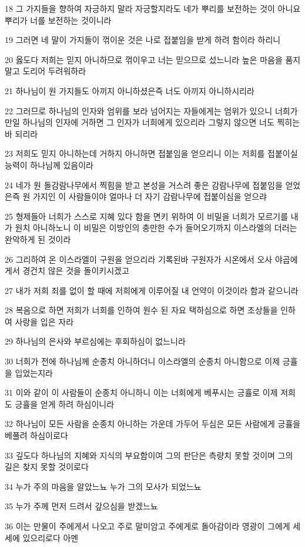 \par 18 그 가지들을 향하여 자긍하지 말라 자긍할지라도 네가 뿌리를 보전하는 것이 아니요 뿌리가 너를 보전하는 것이니라
\par 19 그러면 네 말이 가지들이 꺾이운 것은 나로 접붙임을 받게 하려 함이라 하리니
\par 20 옳도다 저희는 믿지 아니하므로 꺾이우고 너는 믿으므로 섰느니라 높은 마음을 품지 말고 도리어 두려워하라
\par 21 하나님이 원 가지들도 아끼지 아니하셨은즉 너도 아끼지 아니하시리라
\par 22 그러므로 하나님의 인자와 엄위를 보라 넘어지는 자들에게는 엄위가 있으니 너희가 만일 하나님의 인자에 거하면 그 인자가 너희에게 있으리라 그렇지 않으면 너도 찍히는바 되리라
\par 23 저희도 믿지 아니하는데 거하지 아니하면 접붙임을 얻으리니 이는 저희를 접붙이실 능력이 하나님께 있음이라
\par 24 네가 원 돌감람나무에서 찍힘을 받고 본성을 거스려 좋은 감람나무에 접붙임을 얻었은즉 원 가지인 이 사람들이야 얼마나 더 자기 감람나무에 접붙이심을 얻으랴
\par 25 형제들아 너희가 스스로 지혜 있다 함을 면키 위하여 이 비밀을 너희가 모르기를 내가 원치 아니하노니 이 비밀은 이방인의 충만한 수가 들어오기까지 이스라엘의 더러는 완악하게 된 것이라
\par 26 그리하여 온 이스라엘이 구원을 얻으리라 기록된바 구원자가 시온에서 오사 야곱에게서 경건치 않은 것을 돌이키시겠고
\par 27 내가 저희 죄를 없이 할 때에 저희에게 이루어질 내 언약이 이것이라 함과 같으니라
\par 28 복음으로 하면 저희가 너희를 인하여 원수 된 자요 택하심으로 하면 조상들을 인하여 사랑을 입은 자라
\par 29 하나님의 은사와 부르심에는 후회하심이 없느니라
\par 30 너희가 전에 하나님께 순종치 아니하더니 이스라엘의 순종치 아니함으로 이제 긍휼을 입었는지라
\par 31 이와 같이 이 사람들이 순종치 아니하니 이는 너희에게 베푸시는 긍휼로 이제 저희도 긍휼을 얻게 하려 하심이니라
\par 32 하나님이 모든 사람을 순종치 아니하는 가운데 가두어 두심은 모든 사람에게 긍휼을 베풀려 하심이로다
\par 33 깊도다 하나님의 지혜와 지식의 부요함이여 그의 판단은 측량치 못할 것이며 그의 길은 찾지 못할 것이로다
\par 34 누가 주의 마음을 알았느뇨 누가 그의 모사가 되었느뇨
\par 35 누가 주께 먼저 드려서 갚으심을 받겠느뇨
\par 36 이는 만물이 주에게서 나오고 주로 말미암고 주에게로 돌아감이라 영광이 그에게 세세에 있으리로다 아멘

